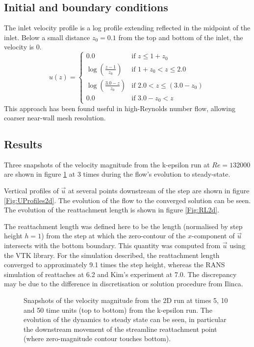 \subsection{Initial and boundary conditions}
The inlet velocity profile is a log profile extending reflected in the midpoint of the inlet. Below a small distance $z_0=0.1$ from the top and bottom of the inlet, the velocity is 0.
\begin{equation*}
u(z) =
  \begin{cases}
    0.0 & \text{if } z \leq 1+z_0 \\
    \log \left(\frac{z-1}{z_0}\right) & \text{if } 1+z_0 < z \leq 2.0 \\
    \log \left(\frac{3.0-z}{z_0}\right) & \text{if } 2.0 < z \leq (3.0-z_0) \\
    0.0 & \text{if } 3.0-z_0 < z
  \end{cases}
\end{equation*}
This approach has been found useful in high-Reynolds number flow, allowing coarser near-wall mesh resolution.

\subsection{Results}
Three snapshots of the velocity magnitude from the k-epsilon run at $Re=132000$
are shown in figure \ref{Fig:velo-magnitude-2d} at 3 times during the flow's evolution to steady-state.

Vertical profiles of $\vec{u}$ at several points downstream of the step are shown
in figure \ref{Fig:UProfiles2d}. The evolution of the flow to the converged solution can be seen.
The evolution of the reattachment length is shown in figure \ref{Fig:RL2d}.

The reattachment length was defined here to be the length (normalised by step height $h=1$)
from the step at which the zero-contour of the $x$-component of $\vec{u}$ intersects with
the bottom boundary. This quantity was computed from $\vec{u}$
using the VTK library. For the simulation described, the reattachment
length converged to approximately 9.1 times the step height,
whereas the RANS simulation of \cite{ilinca_97} reattaches at 6.2 and Kim's experiment at 7.0.
The discrepancy may be due to the difference in discretisation or solution procedure from Ilinca.

\begin{figure}
\centering
{}
\caption{Snapshots of the velocity magnitude from the 2D run at times 5, 10 and 50 time units
(top to bottom) from the k-epsilon run.
The evolution of the dynamics to steady state can be seen, in particular the downstream movement
of the streamline reattachment point (where zero-magnitude contour touches bottom).}
\label{Fig:velo-magnitude-2d}
\end{figure}

